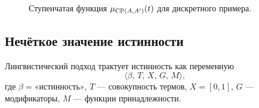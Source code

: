 \begin{figure}[h]
\centering
{}
\caption{Ступенчатая функция $\mu_{\operatorname{CP}(A,A')}(t)$ для дискретного примера.}
\end{figure}

\subsection{Нечёткое значение истинности}

Лингвистический подход трактует истинность как переменную
\[
\langle\beta,\,T,\,X,\,G,\,M\rangle,
\]
где $\beta=\text{«истинность»}$, $T$ — совокупность термов, $X=[0,1]$, $G$ — модификаторы, $M$ — функции принадлежности.

